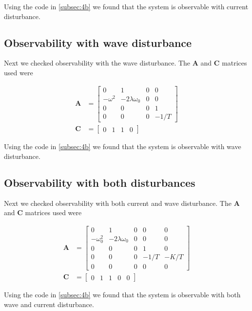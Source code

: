 Using the code in \cref{subsec:4b} we found that the system is observable with current disturbance.

\subsection{Observability with wave disturbance}

Next we checked observability with the wave disturbance. The $\mathbf{A}$ and $\mathbf{C}$ matrices used were

\begin{subequations}
    \begin{align}
        \mathbf{A} &= \begin{bmatrix}
        0 & 1 & 0 & 0 \\
        -\omega^2 & -2\lambda\omega_0 & 0 & 0 \\
        0 & 0 & 0 & 1 \\
        0 & 0 & 0 & - 1/T
        \end{bmatrix} \\
        \mathbf{C} &= \begin{bmatrix}
        0 & 1 & 1 & 0
        \end{bmatrix}
    \end{align}
\end{subequations}

Using the code in \cref{subsec:4b} we found that the system is observable with wave disturbance.

\subsection{Observability with both disturbances}

Next we checked observability with both current and wave disturbance. The $\mathbf{A}$ and $\mathbf{C}$ matrices used were

\begin{subequations}
    \begin{align}
        \mathbf{A} &= \begin{bmatrix}
        0 & 1 & 0 & 0 & 0 \\
        -\omega_0^2 & -2\lambda\omega_0 & 0 & 0 & 0 \\
        0 & 0 & 0 & 1 & 0 \\
        0 & 0 & 0 & -1/T & -K/T \\
        0 & 0 & 0 & 0 & 0
        \end{bmatrix} \\
        \mathbf{C} &= \begin{bmatrix}
        0 & 1 & 1 & 0 & 0
        \end{bmatrix}
    \end{align}
\end{subequations}

Using the code in \cref{subsec:4b} we found that the system is observable with both wave and current disturbance.
